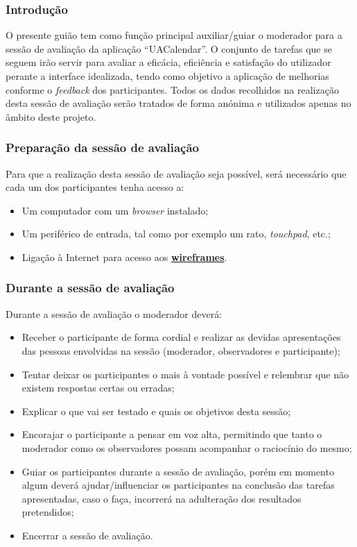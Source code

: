 \documentclass[11pt, twoside]{report}
\begin{document}
		
		\subsubsection*{Introdução}
	O presente guião tem como função principal auxiliar/guiar o moderador para a sessão de avaliação da aplicação “UACalendar”.
	O conjunto de tarefas que se seguem irão servir para avaliar a eficácia, eficiência e satisfação do utilizador perante a interface idealizada, tendo como objetivo a aplicação de melhorias conforme o \textit{feedback} dos participantes.
	Todos os dados recolhidos na realização desta sessão de avaliação serão tratados de forma anónima e utilizados apenas no âmbito deste projeto.
		
		
	\subsubsection*{Preparação da sessão de avaliação}
			Para que a realização desta sessão de avaliação seja possível, será necessário que cada um dos participantes tenha acesso a:
	
	\begin{itemize}
		\item Um computador com um \textit{browser} instalado;
		\item Um periférico de entrada, tal como por exemplo um rato, \textit{touchpad}, etc.;
		\item Ligação à Internet para acesso aos \href{https://www.figma.com/file/nhb5nnIrt3fdDoQhYpsN80/Calendario?node-id=9\%3A154}{\textbf{wireframes}}.
	\end{itemize}

\subsubsection*{Durante a sessão de avaliação}	
Durante a sessão de avaliação o moderador deverá:

	\begin{itemize}
		\item Receber o participante de forma cordial e realizar as devidas apresentações das pessoas envolvidas na sessão (moderador, observadores e participante);
		\item Tentar deixar os participantes o mais à vontade possível e relembrar que não existem respostas certas ou erradas;
		\item Explicar o que vai ser testado e quais os objetivos desta sessão;
		\item Encorajar o participante a pensar em voz alta, permitindo que tanto o moderador como os observadores possam acompanhar o raciocínio do mesmo;
		\item Guiar os participantes durante a sessão de avaliação, porém em momento algum deverá ajudar/influenciar os participantes na conclusão das tarefas apresentadas, caso o faça, incorrerá na adulteração dos resultados pretendidos;
		\item Encerrar a sessão de avaliação.
	\end{itemize}
	
\end{document}
